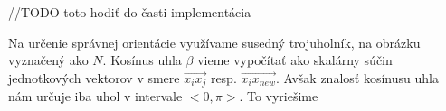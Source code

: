   
    //TODO toto hodiť do časti implementácia
    
    Na určenie správnej orientácie využívame susedný trojuholník, na obrázku vyznačený 
    ako $N$. Kosínus uhla $\beta$ vieme vypočítať ako skalárny súčin jednotkových vektorov 
    v smere $\overrightarrow{x_i x_j}$ resp. $\overrightarrow{x_i x_{new}}$. 
    Avšak znalosť kosínusu uhla nám určuje iba uhol v intervale $<0, \pi>$. To vyriešime 
